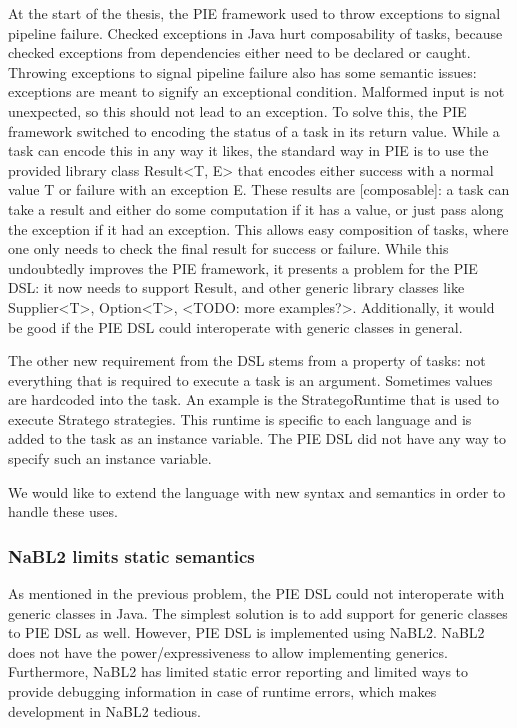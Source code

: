 At the start of the thesis, the PIE framework used to throw exceptions to signal pipeline failure.
Checked exceptions in Java hurt composability of tasks, because checked exceptions from dependencies either need to be declared or caught.
Throwing exceptions to signal pipeline failure also has some semantic issues: exceptions are meant to signify an exceptional condition.
Malformed input is not unexpected, so this should not lead to an exception.
To solve this, the PIE framework switched to encoding the status of a task in its return value.
While a task can encode this in any way it likes, the standard way in PIE is to use the provided library class Result<T, E> that encodes either success with a normal value T or failure with an exception E.
These results are [composable]: a task can take a result and either do some computation if it has a value, or just pass along the exception if it had an exception.
This allows easy composition of tasks, where one only needs to check the final result for success or failure.
While this undoubtedly improves the PIE framework, it presents a problem for the PIE DSL: it now needs to support Result, and other generic library classes like Supplier<T>, Option<T>, <TODO: more examples?>.
Additionally, it would be good if the PIE DSL could interoperate with generic classes in general. 

The other new requirement from the DSL stems from a property of tasks: not everything that is required to execute a task is an argument.
Sometimes values are hardcoded into the task.
An example is the StrategoRuntime that is used to execute Stratego strategies.
This runtime is specific to each language and is added to the task as an instance variable.
The PIE DSL did not have any way to specify such an instance variable.

We would like to extend the language with new syntax and semantics in order to handle these uses.

\subsubsection{NaBL2 limits static semantics}
As mentioned in the previous problem,  the PIE DSL could not interoperate with generic classes in Java.
The simplest solution is to add support for generic classes to PIE DSL as well.
However, PIE DSL is implemented using NaBL2.
NaBL2 does not have the power/expressiveness to allow implementing generics.
Furthermore, NaBL2 has limited static error reporting and limited ways to provide debugging information in case of runtime errors, which makes development in NaBL2 tedious.

